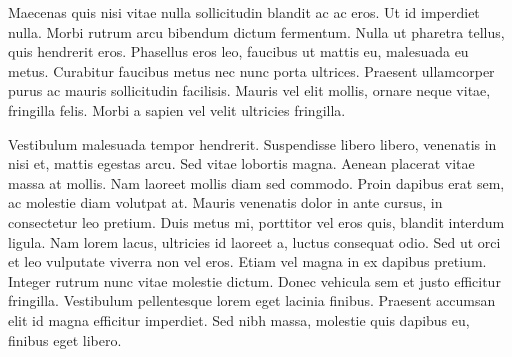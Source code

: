 Maecenas quis nisi vitae nulla sollicitudin blandit ac ac eros. Ut id imperdiet nulla. Morbi rutrum arcu bibendum dictum fermentum. Nulla ut pharetra tellus, quis hendrerit eros. Phasellus eros leo, faucibus ut mattis eu, malesuada eu metus. Curabitur faucibus metus nec nunc porta ultrices. Praesent ullamcorper purus ac mauris sollicitudin facilisis. Mauris vel elit mollis, ornare neque vitae, fringilla felis. Morbi a sapien vel velit ultricies fringilla.

Vestibulum malesuada tempor hendrerit. Suspendisse libero libero, venenatis in nisi et, mattis egestas arcu. Sed vitae lobortis magna. Aenean placerat vitae massa at mollis. Nam laoreet mollis diam sed commodo. Proin dapibus erat sem, ac molestie diam volutpat at. Mauris venenatis dolor in ante cursus, in consectetur leo pretium. Duis metus mi, porttitor vel eros quis, blandit interdum ligula. Nam lorem lacus, ultricies id laoreet a, luctus consequat odio. Sed ut orci et leo vulputate viverra non vel eros. Etiam vel magna in ex dapibus pretium. Integer rutrum nunc vitae molestie dictum. Donec vehicula sem et justo efficitur fringilla. Vestibulum pellentesque lorem eget lacinia finibus. Praesent accumsan elit id magna efficitur imperdiet. Sed nibh massa, molestie quis dapibus eu, finibus eget libero.